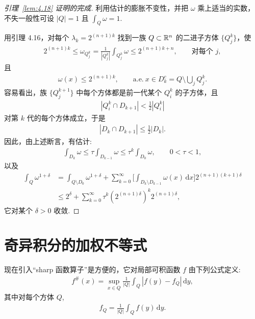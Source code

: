 \begin{proof}[引理~\ref{lem:4.18} 证明的完成]
利用估计的膨胀不变性，并把 $\omega$ 乘上适当的实数，不失一般性可设 $|Q| = 1$ 且 $\int_Q \omega = 1$.

用引理 4.16，对每个 $\lambda_k = 2^{(n+1)k}$ 找到一族 $Q \subset \mathbb{R}^n$ 的二进子方体 $\{Q_j^k\}$，使
\begin{align*}
  2^{(n+1)k}\leq\omega_{Q_{j}^{k}}=\frac{1}{|Q_{j}^{k}|}\int_{Q_{j}^{k}}\omega
  \leq 2^{(n+1)k+n},\qquad \text{对每个 } j,
\end{align*}
且
\begin{align*}
  \omega(x)\leq 2^{(n+1)k},\qquad \text{a.e.}\ x\in D_{k}^{c}=Q\setminus\bigcup_{j}Q_{j}^{k}.
\end{align*}
容易看出，族 $\{Q_j^{k+1}\}$ 中每个方体都是前一代某个 $Q_i^k$ 的子方体，且
\begin{align*}
  |Q_{i}^{k}\cap D_{k+1}|<\frac{1}{2}|Q_{i}^{k}|
\end{align*}
对第 $k$ 代的每个方体成立，于是
\begin{align*}
  |D_{k}\cap D_{k+1}|\leq\frac{1}{2}|D_{k}|.
\end{align*}
因此，由上述断言，有估计:
\begin{align*}
  \int_{D_{k}}\omega\leq\tau\int_{D_{k-1}}\omega\leq\tau^{k}\int_{D_{0}}\omega,\qquad 0<\tau<1,
\end{align*}
以及
\begin{align*}
  \int_{Q}\omega^{1+\delta}
  &=\int_{Q\setminus D_{0}}\omega^{1+\delta}
   +\sum_{k=0}^{\infty}\Big[\int_{D_{k}\setminus D_{k-1}}\omega(x)\,\mathrm{d}x\Big]2^{(n+1)(k+1)\delta}\\
  &\leq 2^{\delta}+\sum_{k=0}^{\infty}\tau^{k}\left(2^{(n+1)\delta}\right)^{k}2^{(n+1)\delta},
\end{align*}
它对某个 $\delta > 0$ 收敛.
\end{proof}

\section{奇异积分的加权不等式}

现在引入``sharp 函数算子''是方便的，它对局部可积函数 $f$ 由下列公式定义:
\begin{align*}
  f^{\#}(x)=\sup_{x\in Q}\frac{1}{|Q|}\int_{Q}\left|f(y)-f_{Q}\right|\,\mathrm{d}y,
\end{align*}
其中对每个方体 $Q$,
\begin{align*}
  f_{Q}=\frac{1}{|Q|}\int_{Q}f(y)\,\mathrm{d}y.
\end{align*}

